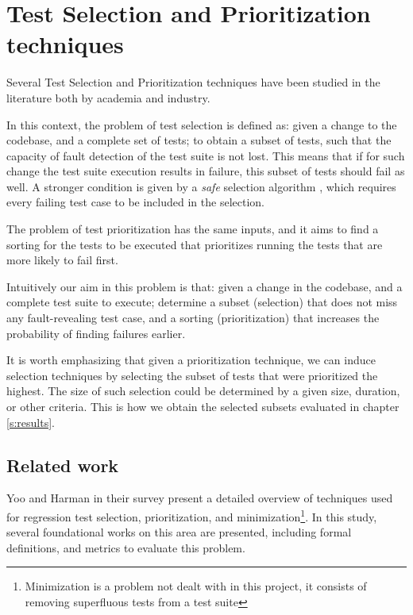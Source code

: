 \section{Test Selection and Prioritization techniques}\label{s:tsp-tech}

Several Test Selection and Prioritization techniques have been studied in
the literature both by academia and industry.

In this context, the problem of test selection is defined as: given a change
to the codebase, and a complete set of tests; to obtain a subset of tests,
such that the capacity of fault detection of the test suite is not lost. This 
means that if for such change the test suite execution results in failure, this subset
of tests should fail as well. A stronger condition is given by a \emph{safe} 
selection algorithm \cite{366926}, which requires every failing test case to be included in the selection.

The problem of test prioritization has the same inputs, and it aims to find a
sorting for the tests to be executed that prioritizes running the tests that
are more likely to fail first.

Intuitively our aim in this problem is that: given a change in the codebase,
and a complete test suite to execute; determine a subset (selection) that
does not miss any fault-revealing test case, and a sorting (prioritization)
that increases the probability of finding failures earlier.

It is worth emphasizing that given a prioritization technique, we can induce
selection techniques by selecting the subset of tests that were prioritized the highest. 
The size of such selection could be determined by a given size, duration, or other criteria.
This is how we obtain the selected subsets evaluated in chapter \ref{s:results}.

\subsection{Related work}
\label{sec:bg-tsp-related-work}

Yoo and Harman in their survey \cite{Yoo2012RegressionTM} present a detailed overview of techniques used for
regression test selection, prioritization, and minimization\footnote{Minimization is a problem not dealt with in this project, it consists of removing superfluous tests from a test suite}.
In this study, several foundational works on this area are presented, including formal definitions, and metrics to evaluate this problem.

